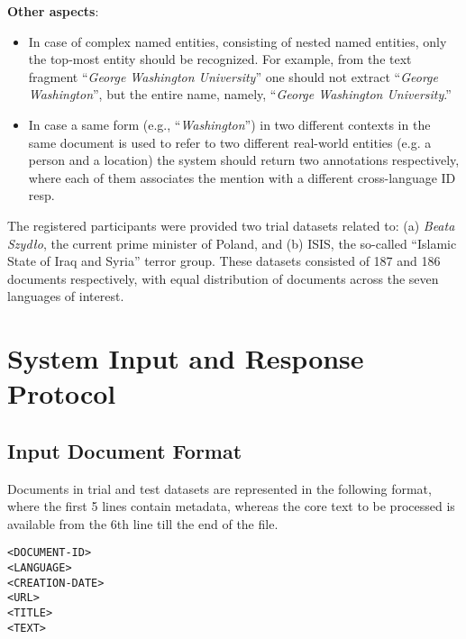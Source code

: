 \documentclass[11pt]{article}
\begin{document}
\noindent \textbf{Other aspects}:

\begin{itemize}

\item In case of complex named entities, consisting of nested named
  entities, only the top-most entity should be recognized. For example,
  from the text fragment ``\textit{George Washington University}'' one
  should not extract ``\textit{George Washington}'', but the entire name,
  namely, ``\textit{George Washington University}.''

\item In case a same form (e.g., ``\textit{Washington}'') in two different
  contexts in the same document is used to refer to two different
  real-world entities (e.g. a person and a location) the system should
  return two annotations respectively, where each of them associates the
  mention with a different cross-language ID resp.

\end{itemize}


The registered participants were provided two trial datasets related to:
(a) {\em Beata Szydło}, the current prime minister of Poland, and (b)
ISIS, the so-called ``Islamic State of Iraq and Syria'' terror group.
These datasets consisted of 187 and 186 documents respectively, with
equal distribution of documents across the seven languages of interest.

\section{System Input and Response Protocol}
\label{sec:protocol}

\subsection{Input Document Format}
\label{subsec:input}

Documents in trial and test datasets are represented in the following
format, where the first 5 lines contain metadata, whereas the core text
to be processed is available from the 6th line till the end of the file.

\begin{small}
\begin{verbatim}
<DOCUMENT-ID>
<LANGUAGE>
<CREATION-DATE>
<URL>
<TITLE>
<TEXT>
\end{verbatim}
\end{small}
\end{document}
